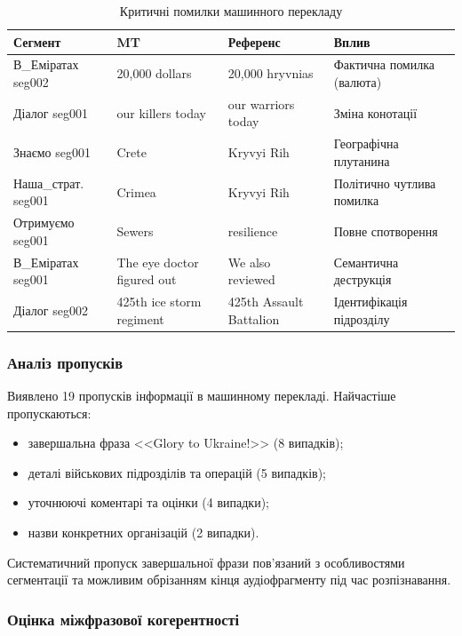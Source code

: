 \begin{table}[H]
\centering
\caption{Критичні помилки машинного перекладу}
\label{tab:critical_errors}
\small
\begin{tabular}{|p{2.5cm}|p{4cm}|p{4cm}|p{3cm}|}
\hline
\textbf{Сегмент} & \textbf{MT} & \textbf{Референс} & \textbf{Вплив} \\
\hline
В\_Еміратах seg002 & 20,000 dollars & 20,000 hryvnias & Фактична помилка (валюта) \\
\hline
Діалог seg001 & our killers today & our warriors today & Зміна конотації \\
\hline
Знаємо seg001 & Crete & Kryvyi Rih & Географічна плутанина \\
\hline
Наша\_страт. seg001 & Crimea & Kryvyi Rih & Політично чутлива помилка \\
\hline
Отримуємо seg001 & Sewers & resilience & Повне спотворення \\
\hline
В\_Еміратах seg001 & The eye doctor figured out & We also reviewed & Семантична деструкція \\
\hline
Діалог seg002 & 425th ice storm regiment & 425th Assault Battalion & Ідентифікація підрозділу \\
\hline
\end{tabular}
\end{table}

\subsubsection{Аналіз пропусків}

Виявлено 19 пропусків інформації в машинному перекладі. Найчастіше пропускаються:
\begin{itemize}[nosep]
    \item завершальна фраза <<Glory to Ukraine!>> (8 випадків);
    \item деталі військових підрозділів та операцій (5 випадків);
    \item уточнюючі коментарі та оцінки (4 випадки);
    \item назви конкретних організацій (2 випадки).
\end{itemize}

Систематичний пропуск завершальної фрази пов'язаний з особливостями сегментації
та можливим обрізанням кінця аудіофрагменту під час розпізнавання.

\subsubsection{Оцінка міжфразової когерентності}

